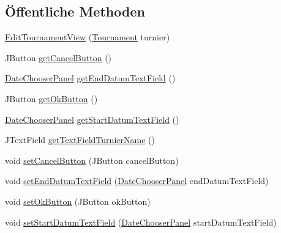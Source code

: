 \subsection*{Öffentliche Methoden}
\begin{DoxyCompactItemize}
\item 
\hyperlink{classde_1_1turnierverwaltung_1_1view_1_1_edit_tournament_view_ad65089ec48ca2012e18d06184a2b3e5e}{Edit\+Tournament\+View} (\hyperlink{classde_1_1turnierverwaltung_1_1model_1_1_tournament}{Tournament} turnier)
\item 
J\+Button \hyperlink{classde_1_1turnierverwaltung_1_1view_1_1_edit_tournament_view_a460cd5bf2b04acc0a1b4c1dedc279051}{get\+Cancel\+Button} ()
\item 
\hyperlink{classde_1_1turnierverwaltung_1_1view_1_1_date_chooser_panel}{Date\+Chooser\+Panel} \hyperlink{classde_1_1turnierverwaltung_1_1view_1_1_edit_tournament_view_ab6db45306514d1ab2ea74fadf282d058}{get\+End\+Datum\+Text\+Field} ()
\item 
J\+Button \hyperlink{classde_1_1turnierverwaltung_1_1view_1_1_edit_tournament_view_a4a4ba61ca5b33b617e53f0316cf0a5d5}{get\+Ok\+Button} ()
\item 
\hyperlink{classde_1_1turnierverwaltung_1_1view_1_1_date_chooser_panel}{Date\+Chooser\+Panel} \hyperlink{classde_1_1turnierverwaltung_1_1view_1_1_edit_tournament_view_a8e7f24cb763f2732f82c2d3c2a261c20}{get\+Start\+Datum\+Text\+Field} ()
\item 
J\+Text\+Field \hyperlink{classde_1_1turnierverwaltung_1_1view_1_1_edit_tournament_view_af5f9a5b356950e2133b44772536e31c4}{get\+Text\+Field\+Turnier\+Name} ()
\item 
void \hyperlink{classde_1_1turnierverwaltung_1_1view_1_1_edit_tournament_view_a76e01deb8a71102dac6b889fe8485e53}{set\+Cancel\+Button} (J\+Button cancel\+Button)
\item 
void \hyperlink{classde_1_1turnierverwaltung_1_1view_1_1_edit_tournament_view_abc85704d1f46def6be45c976177fd4f4}{set\+End\+Datum\+Text\+Field} (\hyperlink{classde_1_1turnierverwaltung_1_1view_1_1_date_chooser_panel}{Date\+Chooser\+Panel} end\+Datum\+Text\+Field)
\item 
void \hyperlink{classde_1_1turnierverwaltung_1_1view_1_1_edit_tournament_view_a957d3ff1e4c53155cd3ab8107ba4cf15}{set\+Ok\+Button} (J\+Button ok\+Button)
\item 
void \hyperlink{classde_1_1turnierverwaltung_1_1view_1_1_edit_tournament_view_a6e5e84e732dc222e1f389ce288fb537a}{set\+Start\+Datum\+Text\+Field} (\hyperlink{classde_1_1turnierverwaltung_1_1view_1_1_date_chooser_panel}{Date\+Chooser\+Panel} start\+Datum\+Text\+Field)

\end{DoxyCompactItemize}
